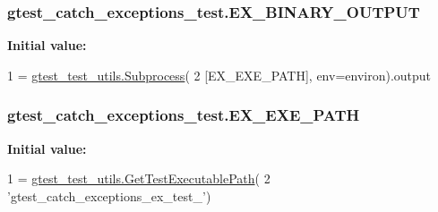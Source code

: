 \subsubsection[{\texorpdfstring{E\+X\+\_\+\+B\+I\+N\+A\+R\+Y\+\_\+\+O\+U\+T\+P\+UT}{EX_BINARY_OUTPUT}}]{\setlength{\rightskip}{0pt plus 5cm}gtest\+\_\+catch\+\_\+exceptions\+\_\+test.\+E\+X\+\_\+\+B\+I\+N\+A\+R\+Y\+\_\+\+O\+U\+T\+P\+UT}\hypertarget{namespacegtest__catch__exceptions__test_a012f2b0e05fd56aa6817595da940c891}{}\label{namespacegtest__catch__exceptions__test_a012f2b0e05fd56aa6817595da940c891}
{\bfseries Initial value\+:}
\begin{DoxyCode}
1 = \hyperlink{classgtest__test__utils_1_1_subprocess}{gtest\_test\_utils.Subprocess}(
2     [EX\_EXE\_PATH], env=environ).output
\end{DoxyCode}
\subsubsection[{\texorpdfstring{E\+X\+\_\+\+E\+X\+E\+\_\+\+P\+A\+TH}{EX_EXE_PATH}}]{\setlength{\rightskip}{0pt plus 5cm}gtest\+\_\+catch\+\_\+exceptions\+\_\+test.\+E\+X\+\_\+\+E\+X\+E\+\_\+\+P\+A\+TH}\hypertarget{namespacegtest__catch__exceptions__test_a2154a0f0c4c506089d686c1365d288be}{}\label{namespacegtest__catch__exceptions__test_a2154a0f0c4c506089d686c1365d288be}
{\bfseries Initial value\+:}
\begin{DoxyCode}
1 = \hyperlink{namespacegtest__test__utils_a89ed3717984a80ffbb7a9c92f71b86a2}{gtest\_test\_utils.GetTestExecutablePath}(
2     \textcolor{stringliteral}{'gtest\_catch\_exceptions\_ex\_test\_'})
\end{DoxyCode}
